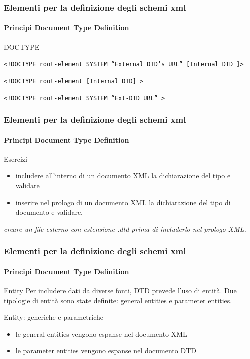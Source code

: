 \begin{frame}
    \frametitle{Elementi per la definizione degli schemi xml}
    \framesubtitle{Principi Document Type Definition}
    \addtocounter{nframe}{1}

    \begin{block}{DOCTYPE}
    \begin{center}\texttt{<!DOCTYPE root-element SYSTEM ``External DTD’s URL'' [Internal DTD ]>}\end{center}
    \begin{center}\texttt{<!DOCTYPE root-element [Internal DTD] >}\end{center}
    \begin{center}\texttt{<!DOCTYPE root-element SYSTEM ``Ext-DTD URL'' >}\end{center}
        
    \end{block}


\end{frame}

\begin{frame}
    \frametitle{Elementi per la definizione degli schemi xml}
    \framesubtitle{Principi Document Type Definition}
    \addtocounter{nframe}{1}

    \begin{block}{Esercizi}
    \begin{itemize}
        \item includere all'interno di un documento XML la dichiarazione del tipo e validare
        \item inserire nel prologo di un documento XML la dichiarazione del tipo di documento e validare.
    \end{itemize}
    \end{block}

    \textit{creare un file esterno con estensione .dtd prima di includerlo nel prologo XML.}

\end{frame}

\begin{frame}
    \frametitle{Elementi per la definizione degli schemi xml}
    \framesubtitle{Principi Document Type Definition}
    \addtocounter{nframe}{1}

    \begin{block}{Entity}
        Per includere dati da diverse fonti, DTD prevede l'uso di entità. Due tipologie di entità sono state definite: general entities e parameter entities.
    \end{block}

    \begin{block}{Entity: generiche e parametriche}
    \begin{itemize}
        \item le general entities vengono espanse nel documento XML
        \item le parameter entities vengono espanse nel documento DTD
    \end{itemize}
    \end{block}
    
\end{frame}

